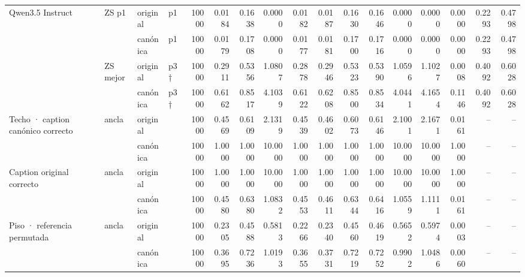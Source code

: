 \begin{tabular}{llllrrrrrrrrrrrrr}
\cline{1-17} \cline{2-17}
\multirow[t]{4}{*}{Qwen3.5 Instruct} & \multirow[t]{2}{*}{ZS p1} & original & p1 & 10000 & 0.0184 & 0.1638 & 0.0000 & 0.0182 & 0.0187 & 0.1630 & 0.1646 & 0.0000 & 0.0000 & 0.0000 & 0.2293 & 0.4798 \\
 &  & canónica & p1 & 10000 & 0.0179 & 0.1708 & 0.0000 & 0.0177 & 0.0181 & 0.1700 & 0.1716 & 0.0000 & 0.0000 & 0.0000 & 0.2293 & 0.4798 \\
\cline{2-17}
 & \multirow[t]{2}{*}{ZS mejor} & original & p3 † & 10000 & 0.2911 & 0.5356 & 1.0807 & 0.2878 & 0.2946 & 0.5323 & 0.5390 & 1.0596 & 1.1027 & 0.0008 & 0.4092 & 0.6028 \\
 &  & canónica & p3 † & 10000 & 0.6162 & 0.8517 & 4.1039 & 0.6122 & 0.6208 & 0.8500 & 0.8534 & 4.0441 & 4.1654 & 0.1146 & 0.4092 & 0.6028 \\
\cline{1-17} \cline{2-17}
\multirow[t]{2}{*}{Techo · caption canónico correcto} & \multirow[t]{2}{*}{ancla} & original &  & 10000 & 0.4569 & 0.6109 & 2.1319 & 0.4539 & 0.4602 & 0.6073 & 0.6146 & 2.1001 & 2.1671 & 0.0161 & -- & -- \\
 &  & canónica &  & 10000 & 1.0000 & 1.0000 & 10.0000 & 1.0000 & 1.0000 & 1.0000 & 1.0000 & 10.0000 & 10.0000 & 1.0000 & -- & -- \\
\cline{1-17} \cline{2-17}
\multirow[t]{2}{*}{Caption original correcto} & \multirow[t]{2}{*}{ancla} & original &  & 10000 & 1.0000 & 1.0000 & 10.0000 & 1.0000 & 1.0000 & 1.0000 & 1.0000 & 10.0000 & 10.0000 & 1.0000 & -- & -- \\
 &  & canónica &  & 10000 & 0.4580 & 0.6380 & 1.0832 & 0.4553 & 0.4611 & 0.6344 & 0.6416 & 1.0559 & 1.1111 & 0.0161 & -- & -- \\
\cline{1-17} \cline{2-17}
\multirow[t]{2}{*}{Piso · referencia permutada} & \multirow[t]{2}{*}{ancla} & original &  & 10000 & 0.2305 & 0.4588 & 0.5813 & 0.2266 & 0.2340 & 0.4560 & 0.4619 & 0.5652 & 0.5974 & 0.0003 & -- & -- \\
 &  & canónica &  & 10000 & 0.3695 & 0.7236 & 1.0193 & 0.3655 & 0.3731 & 0.7219 & 0.7252 & 0.9902 & 1.0486 & 0.0060 & -- & -- \\
\cline{1-17} \cline{2-17}
\bottomrule
\end{tabular}

